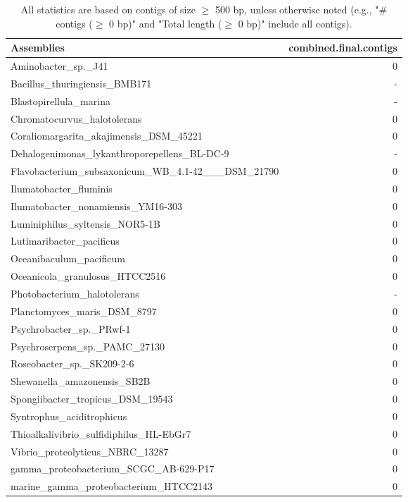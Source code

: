 \documentclass[12pt,a4paper]{article}
\begin{document}
\begin{table}[ht]
\begin{center}
\caption{All statistics are based on contigs of size $\geq$ 500 bp, unless otherwise noted (e.g., "\# contigs ($\geq$ 0 bp)" and "Total length ($\geq$ 0 bp)" include all contigs).}
\begin{tabular}{|l*{1}{|r}|}
\hline
Assemblies & combined.final.contigs \\ \hline
Aminobacter\_sp.\_J41 & 0 \\ \hline
Bacillus\_thuringiensis\_BMB171 & - \\ \hline
Blastopirellula\_marina & - \\ \hline
Chromatocurvus\_halotolerans & 0 \\ \hline
Coraliomargarita\_akajimensis\_DSM\_45221 & 0 \\ \hline
Dehalogenimonas\_lykanthroporepellens\_BL-DC-9 & - \\ \hline
Flavobacterium\_subsaxonicum\_WB\_4.1-42\_\_\_DSM\_21790 & 0 \\ \hline
Ilumatobacter\_fluminis & 0 \\ \hline
Ilumatobacter\_nonamiensis\_YM16-303 & 0 \\ \hline
Luminiphilus\_syltensis\_NOR5-1B & 0 \\ \hline
Lutimaribacter\_pacificus & 0 \\ \hline
Oceanibaculum\_pacificum & 0 \\ \hline
Oceanicola\_granulosus\_HTCC2516 & 0 \\ \hline
Photobacterium\_halotolerans & - \\ \hline
Planctomyces\_maris\_DSM\_8797 & 0 \\ \hline
Psychrobacter\_sp.\_PRwf-1 & 0 \\ \hline
Psychroserpens\_sp.\_PAMC\_27130 & 0 \\ \hline
Roseobacter\_sp.\_SK209-2-6 & 0 \\ \hline
Shewanella\_amazonensis\_SB2B & 0 \\ \hline
Spongiibacter\_tropicus\_DSM\_19543 & 0 \\ \hline
Syntrophus\_aciditrophicus & 0 \\ \hline
Thioalkalivibrio\_sulfidiphilus\_HL-EbGr7 & 0 \\ \hline
Vibrio\_proteolyticus\_NBRC\_13287 & 0 \\ \hline
gamma\_proteobacterium\_SCGC\_AB-629-P17 & 0 \\ \hline
marine\_gamma\_proteobacterium\_HTCC2143 & 0 \\ \hline
\end{tabular}
\end{center}
\end{table}
\end{document}
